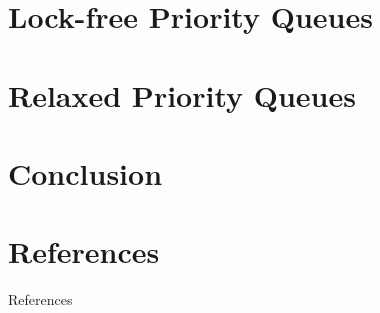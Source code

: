 \documentclass[usenames,dvipsnames]{beamer}
\begin{document}
\section{Lock-free Priority Queues}

\section{Relaxed Priority Queues}

\section{Conclusion}

\section{References}

\begin{frame}[allowframebreaks]{References}
\printbibliography
\end{frame}
\end{document}
